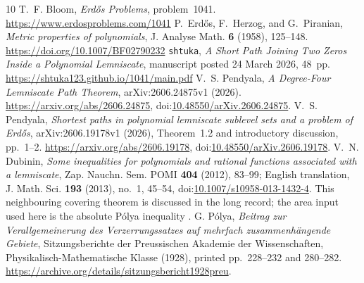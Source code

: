 \documentclass[11pt]{article}
\begin{document}
\begin{thebibliography}{10}
 T.~F. Bloom, \emph{Erd\H{o}s Problems}, problem~1041.
  \url{https://www.erdosproblems.com/1041}
 P.~Erd\H{o}s, F.~Herzog, and G.~Piranian,
  \emph{Metric properties of polynomials}, J. Analyse Math. \textbf{6}
  (1958), 125--148. \url{https://doi.org/10.1007/BF02790232}
 \texttt{shtuka},
  \emph{A Short Path Joining Two Zeros Inside a Polynomial Lemniscate},
  manuscript posted 24 March 2026, 48~pp.
  \url{https://shtuka123.github.io/1041/main.pdf}
 V.~S. Pendyala,
  \emph{A Degree-Four Lemniscate Path Theorem},
  arXiv:2606.24875v1 (2026).
  \url{https://arxiv.org/abs/2606.24875},
  doi:\href{https://doi.org/10.48550/arXiv.2606.24875}
  {10.48550/arXiv.2606.24875}.
 V.~S. Pendyala,
  \emph{Shortest paths in polynomial lemniscate sublevel sets and a problem
  of Erd\H{o}s}, arXiv:2606.19178v1 (2026),
  Theorem~1.2 and introductory discussion, pp.~1--2.
  \url{https://arxiv.org/abs/2606.19178},
  doi:\href{https://doi.org/10.48550/arXiv.2606.19178}
  {10.48550/arXiv.2606.19178}.
 V.~N. Dubinin, \emph{Some inequalities for polynomials and
  rational functions associated with a lemniscate}, Zap. Nauchn. Sem. POMI
  \textbf{404} (2012), 83--99; English translation, J. Math. Sci. \textbf{193}
  (2013), no.~1, 45--54,
  doi:\href{https://doi.org/10.1007/s10958-013-1432-4}{10.1007/s10958-013-1432-4}.
  This neighbouring covering theorem is discussed in the long record; the area input used here is the absolute P\'olya inequality \cite{polya1928}.
 G. P\'olya,
  \emph{Beitrag zur Verallgemeinerung des Verzerrungssatzes auf mehrfach
  zusammenh\"angende Gebiete}, Sitzungsberichte der Preussischen Akademie der
  Wissenschaften, Physikalisch-Mathematische Klasse (1928), printed
  pp.~228--232 and 280--282.
  \url{https://archive.org/details/sitzungsbericht1928preu}.
\end{thebibliography}

\companionpapercontext
\end{document}
